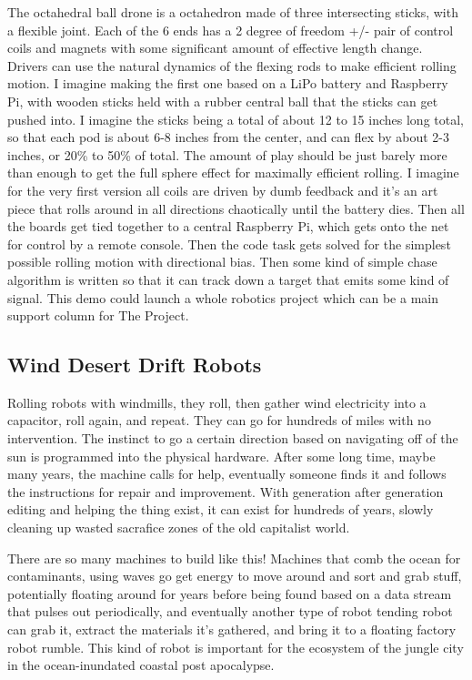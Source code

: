 The octahedral ball drone is a octahedron made of three intersecting
sticks, with a flexible joint. Each of the 6 ends has a 2 degree of
freedom +/- pair of control coils and magnets with some significant
amount of effective length change. Drivers can use the natural dynamics
of the flexing rods to make efficient rolling motion. I imagine making
the first one based on a LiPo battery and Raspberry Pi, with wooden
sticks held with a rubber central ball that the sticks can get pushed
into. I imagine the sticks being a total of about 12 to 15 inches long
total, so that each pod is about 6-8 inches from the center, and can
flex by about 2-3 inches, or 20\% to 50\% of total. The amount of play
should be just barely more than enough to get the full sphere effect for
maximally efficient rolling. I imagine for the very first version all
coils are driven by dumb feedback and it's an art piece that rolls
around in all directions chaotically until the battery dies. Then all
the boards get tied together to a central Raspberry Pi, which gets onto
the net for control by a remote console. Then the code task gets solved
for the simplest possible rolling motion with directional bias. Then
some kind of simple chase algorithm is written so that it can track down
a target that emits some kind of signal. This demo could launch a whole
robotics project which can be a main support column for The Project.

\subsection{Wind Desert Drift Robots}\label{wind-desert-drift-robots}

Rolling robots with windmills, they roll, then gather wind electricity
into a capacitor, roll again, and repeat. They can go for hundreds of
miles with no intervention. The instinct to go a certain direction based
on navigating off of the sun is programmed into the physical hardware.
After some long time, maybe many years, the machine calls for help,
eventually someone finds it and follows the instructions for repair and
improvement. With generation after generation editing and helping the
thing exist, it can exist for hundreds of years, slowly cleaning up
wasted sacrafice zones of the old capitalist world.

There are so many machines to build like this! Machines that comb the
ocean for contaminants, using waves go get energy to move around and
sort and grab stuff, potentially floating around for years before being
found based on a data stream that pulses out periodically, and
eventually another type of robot tending robot can grab it, extract the
materials it's gathered, and bring it to a floating factory robot
rumble. This kind of robot is important for the ecosystem of the jungle
city in the ocean-inundated coastal post apocalypse.

